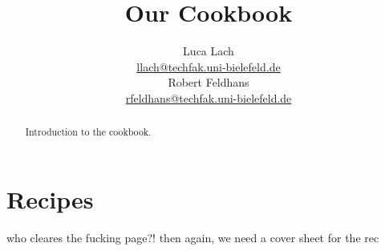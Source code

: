 \documentclass[%
a4paper,
11pt
]{article}
\begin{document}
	
	\title{Our Cookbook}
	\author{Luca Lach\\ 
		\href{mailto:llach@techfak.uni-bielefeld.de}{llach@techfak.uni-bielefeld.de}\\
		Robert Feldhans\\ 
		\href{mailto:rfeldhans@techfak.uni-bielefeld.de}{rfeldhans@techfak.uni-bielefeld.de}}
	\maketitle
	
	\begin{abstract}
		Introduction to the cookbook.
	\end{abstract}
	
	\tableofcontents
	
	
	
	\section{Recipes}
	who cleares the fucking page?! then again, we need a cover sheet for the rec
	
	
	
\end{document}
